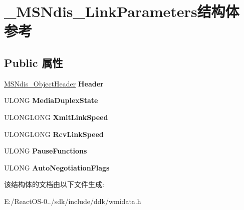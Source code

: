 \hypertarget{struct___m_s_ndis___link_parameters}{}\section{\+\_\+\+M\+S\+Ndis\+\_\+\+Link\+Parameters结构体 参考}
\label{struct___m_s_ndis___link_parameters}
\subsection*{Public 属性}
\begin{DoxyCompactItemize}
\item 
\mbox{\label{struct___m_s_ndis___link_parameters_ad20a7853d41ccebb9f2610bc53fe51e4}} 
\hyperlink{struct___m_s_ndis___object_header}{M\+S\+Ndis\+\_\+\+Object\+Header} {\bfseries Header}
\item 
\mbox{\label{struct___m_s_ndis___link_parameters_aacfd7c762df9c32c3276d29316fefa0f}} 
U\+L\+O\+NG {\bfseries Media\+Duplex\+State}
\item 
\mbox{\label{struct___m_s_ndis___link_parameters_ab68b1372aa052ac0c8a7b002a520897c}} 
U\+L\+O\+N\+G\+L\+O\+NG {\bfseries Xmit\+Link\+Speed}
\item 
\mbox{\label{struct___m_s_ndis___link_parameters_a27b0c497327b4d1bbbfe5273da81b029}} 
U\+L\+O\+N\+G\+L\+O\+NG {\bfseries Rcv\+Link\+Speed}
\item 
\mbox{\label{struct___m_s_ndis___link_parameters_a63865fa95a9c0f98a02dcdf96dba6fa6}} 
U\+L\+O\+NG {\bfseries Pause\+Functions}
\item 
\mbox{\label{struct___m_s_ndis___link_parameters_a5054cf0f3e2f0e40028693702c0a07d1}} 
U\+L\+O\+NG {\bfseries Auto\+Negotiation\+Flags}
\end{DoxyCompactItemize}


该结构体的文档由以下文件生成\+:\begin{DoxyCompactItemize}
\item 
E\+:/\+React\+O\+S-\/0../sdk/include/ddk/wmidata.\+h\end{DoxyCompactItemize}
